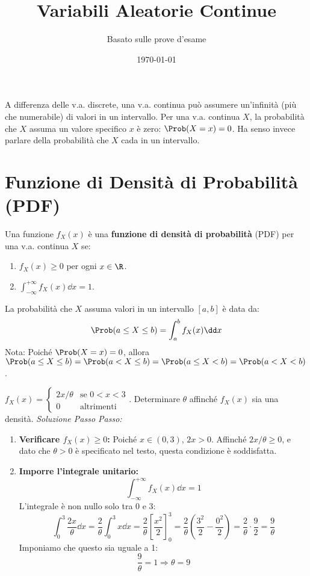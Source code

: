 

\title{Variabili Aleatorie Continue}
\author{Basato sulle prove d'esame}
\date{\today}



\maketitle
\tableofcontents
\newpage

\label{cap:va_continue}
A differenza delle v.a. discrete, una v.a. continua può assumere un'infinità (più che numerabile) di valori in un intervallo. Per una v.a. continua $X$, la probabilità che $X$ assuma un valore specifico $x$ è zero: $\Prob(X=x)=0$. Ha senso invece parlare della probabilità che $X$ cada in un intervallo.

\section{Funzione di Densità di Probabilità (PDF)}
\begin{definition}
Una funzione $f_X(x)$ è una \textbf{funzione di densità di probabilità} (PDF) per una v.a. continua $X$ se:
\begin{enumerate}
    \item $f_X(x) \ge 0$ per ogni $x \in \R$.
    \item $\int_{-\infty}^{+\infty} f_X(x) \dd x = 1$.
\end{enumerate}
La probabilità che $X$ assuma valori in un intervallo $[a,b]$ è data da:
\[ \Prob(a \le X \le b) = \int_a^b f_X(x) \dd x \]
Nota: Poiché $\Prob(X=x)=0$, allora $\Prob(a \le X \le b) = \Prob(a < X \le b) = \Prob(a \le X < b) = \Prob(a < X < b)$.
\end{definition}

\begin{example}
$f_X(x) = \begin{cases} 2x/\theta & \text{se } 0 < x < 3 \\ 0 & \text{altrimenti} \end{cases}$. Determinare $\theta$ affinché $f_X(x)$ sia una densità.
\textit{Soluzione Passo Passo:}
\begin{enumerate}
    \item \textbf{Verificare $f_X(x) \ge 0$:}
    Poiché $x \in (0,3)$, $2x > 0$. Affinché $2x/\theta \ge 0$, e dato che $\theta>0$ è specificato nel testo, questa condizione è soddisfatta.
    \item \textbf{Imporre l'integrale unitario:}
    \[ \int_{-\infty}^{+\infty} f_X(x) \dd x = 1 \]
    L'integrale è non nullo solo tra 0 e 3:
    \[ \int_0^3 \frac{2x}{\theta} \dd x = \frac{2}{\theta} \int_0^3 x \dd x = \frac{2}{\theta} \left[ \frac{x^2}{2} \right]_0^3 = \frac{2}{\theta} \left( \frac{3^2}{2} - \frac{0^2}{2} \right) = \frac{2}{\theta} \cdot \frac{9}{2} = \frac{9}{\theta} \]
    Imponiamo che questo sia uguale a 1:
    \[ \frac{9}{\theta} = 1 \Rightarrow \theta = 9 \]
\end{enumerate}
\end{example}


